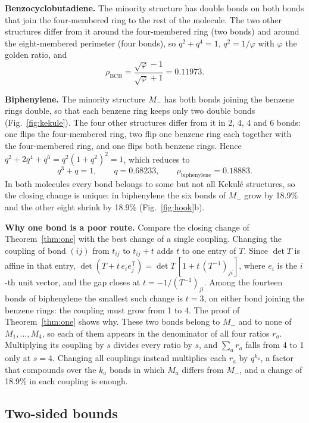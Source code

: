 \documentclass[11pt]{article}
\newcommand{\T}{\mathsf{T}}
\begin{document}
\textbf{Benzocyclobutadiene.} The minority structure has double bonds on both bonds that join the four-membered ring to the rest of the molecule. The two other structures differ from it around the four-membered ring (two bonds) and around the eight-membered perimeter (four bonds), so $q^2+q^4=1$, $q^2=1/\varphi$ with $\varphi$ the golden ratio, and
\begin{equation}
\rho_{\text{BCB}}=\frac{\sqrt{\varphi}-1}{\sqrt{\varphi}+1}=0.11973 .
\end{equation}

\textbf{Biphenylene.} The minority structure $M_-$ has both bonds joining the benzene rings double, so that each benzene ring keeps only two double bonds (Fig.~\ref{fig:kekule}). The four other structures differ from it in 2, 4, 4 and 6 bonds: one flips the four-membered ring, two flip one benzene ring each together with the four-membered ring, and one flips both benzene rings. Hence $q^2+2q^4+q^6=q^2(1+q^2)^2=1$, which reduces to
\begin{equation}
q^3+q=1,\qquad q=0.68233,\qquad \rho_{\text{biphenylene}}=0.18883 .
\end{equation}
In both molecules every bond belongs to some but not all Kekul\'e structures, so the closing change is unique: in biphenylene the six bonds of $M_-$ grow by 18.9\% and the other eight shrink by 18.9\% (Fig.~\ref{fig:hook}b).

\textbf{Why one bond is a poor route.} Compare the closing change of Theorem~\ref{thm:one} with the best change of a single coupling. Changing the coupling of bond $(ij)$ from $t_{ij}$ to $t_{ij}+t$ adds $t$ to one entry of $T$. Since $\det T$ is affine in that entry, $\det(T+t\,e_ie_j^\T)=\det T\,[1+t\,(T^{-1})_{ji}]$, where $e_i$ is the $i$-th unit vector, and the gap closes at $t=-1/(T^{-1})_{ji}$. Among the fourteen bonds of biphenylene the smallest such change is $t=3$, on either bond joining the benzene rings: the coupling must grow from 1 to 4. The proof of Theorem~\ref{thm:one} shows why. These two bonds belong to $M_-$ and to none of $M_1,\dots,M_4$, so each of them appears in the denominator of all four ratios $r_a$. Multiplying its coupling by $s$ divides every ratio by $s$, and $\sum_ar_a$ falls from 4 to 1 only at $s=4$. Changing all couplings instead multiplies each $r_a$ by $q^{k_a}$, a factor that compounds over the $k_a$ bonds in which $M_a$ differs from $M_-$, and a change of 18.9\% in each coupling is enough.

\subsection{Two-sided bounds}
\end{document}
